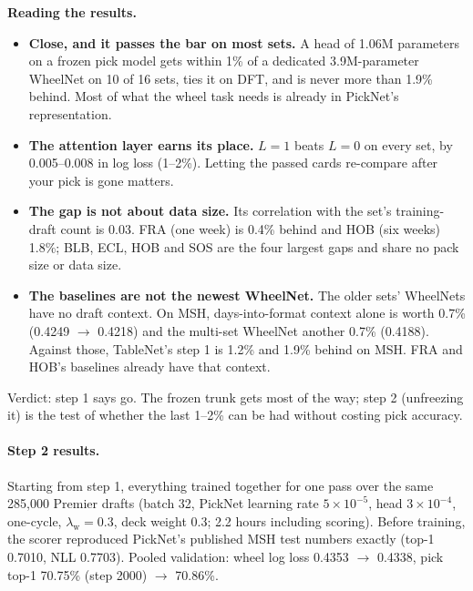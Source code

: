 \documentclass[11pt,letterpaper]{article}
\begin{document}
\noindent\textbf{Reading the results.}
\begin{itemize}
\item \textbf{Close, and it passes the bar on most sets.} A head of 1.06M parameters on a frozen pick model
gets within 1\% of a dedicated 3.9M-parameter WheelNet on 10 of 16 sets, ties it on DFT, and is never more
than 1.9\% behind. Most of what the wheel task needs is already in PickNet's representation.
\item \textbf{The attention layer earns its place.} $L=1$ beats $L=0$ on every set, by 0.005--0.008 in log
loss (1--2\%). Letting the passed cards re-compare after your pick is gone matters.
\item \textbf{The gap is not about data size.} Its correlation with the set's training-draft count is 0.03.
FRA (one week) is 0.4\% behind and HOB (six weeks) 1.8\%; BLB, ECL, HOB and SOS are the four largest gaps and
share no pack size or data size.
\item \textbf{The baselines are not the newest WheelNet.} The older sets' WheelNets have no draft context. On
MSH, days-into-format context alone is worth 0.7\% (0.4249 $\to$ 0.4218) and the multi-set WheelNet another
0.7\% (0.4188). Against those, TableNet's step 1 is 1.2\% and 1.9\% behind on MSH. FRA and HOB's baselines
already have that context.
\end{itemize}

\noindent Verdict: step 1 says go. The frozen trunk gets most of the way; step 2 (unfreezing it) is the test
of whether the last 1--2\% can be had without costing pick accuracy.

\paragraph{Step 2 results.} Starting from step 1, everything trained together for one pass over the same
285,000 Premier drafts (batch 32, PickNet learning rate $5\times10^{-5}$, head $3\times10^{-4}$, one-cycle,
$\lambda_{\text{w}}=0.3$, deck weight 0.3; 2.2 hours including scoring). Before training, the scorer reproduced
PickNet's published MSH test numbers exactly (top-1 0.7010, NLL 0.7703). Pooled validation: wheel log loss
0.4353 $\to$ 0.4338, pick top-1 70.75\% (step 2000) $\to$ 70.86\%.
\end{document}
